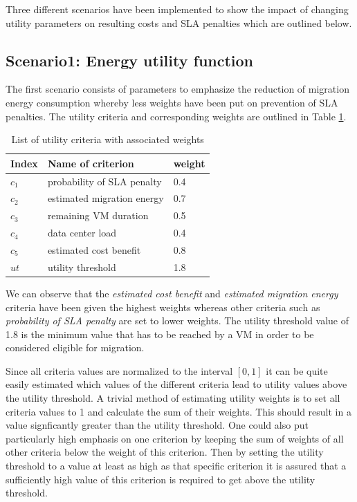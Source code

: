 Three different scenarios have been implemented to show the impact of changing utility parameters on resulting costs and SLA penalties which are outlined below. 

\subsection{Scenario1: Energy utility function}

The first scenario consists of parameters to emphasize the reduction of migration energy consumption whereby less weights have been put on prevention of SLA penalties. 
The utility criteria and corresponding weights are outlined in Table \ref{tab:list_of_utility_criteria_weights}. 

\begin{table}[htbp]
\centering
\begin{tabular}{lll}
\toprule
	Index & Name of criterion	& weight \\
\midrule
	$c_1$ & probability of SLA penalty & 0.4 \\
	$c_2$ & estimated migration energy & 0.7 \\
	$c_3$ & remaining VM duration & 0.5 \\
	$c_4$ & data center load & 0.4 \\
	$c_5$ & estimated cost benefit & 0.8 \\
	$ut$ & utility threshold & 1.8 \\
\bottomrule
\end{tabular}
\caption{List of utility criteria with associated weights}
\label{tab:list_of_utility_criteria_weights}
\end{table}

We can observe that the \textit{estimated cost benefit} and \textit{estimated migration energy} criteria have been given the highest weights whereas other criteria such as \textit{probability of SLA penalty} are set to lower weights. 
The utility threshold value of 1.8 is the minimum value that has to be reached by a VM in order to be considered eligible for migration. 

Since all criteria values are normalized to the interval $[0,1]$ it can be quite easily estimated which values of the different criteria lead to utility values above the utility threshold. A trivial method of estimating utility weights is to set all criteria values to 1 and calculate the sum of their weights. This should result in a value signficantly greater than the utility threshold. One could also put particularly high emphasis on one criterion by keeping the sum of weights of all other criteria below the weight of this criterion. Then by setting the utility threshold to a value at least as high as that specific criterion it is assured that a sufficiently high value of this criterion is required to get above the utility threshold. 

